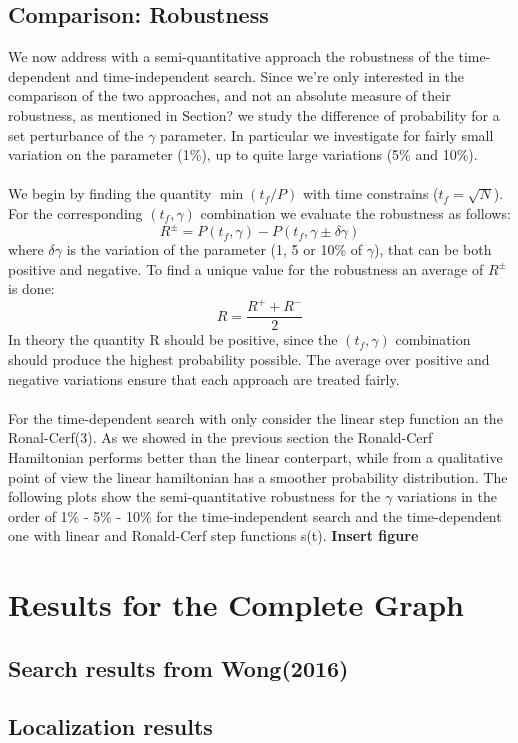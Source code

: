     \subsection{Comparison: Robustness}
    We now address with a semi-quantitative approach the robustness of the time-dependent and time-independent search. Since we're only interested in the comparison of the two approaches, and not an absolute measure of their robustness, as mentioned in Section? we study the difference of probability for a set perturbance of the $\gamma$ parameter. In particular we investigate for fairly small variation on the parameter (1\%), up to quite large variations (5\% and 10\%). \\ \\We begin by finding the quantity $\min(t_f/P)$ with time constrains ($t_f = \sqrt{N}$). For the corresponding $(t_f,\gamma)$ combination we evaluate the robustness as follows:
    \begin{equation}
        R ^\pm = P(t_f, \gamma) - P(t_f, \gamma \pm \delta\gamma)
    \end{equation}
    where $\delta\gamma$ is the variation of the parameter (1, 5 or 10\% of $\gamma$), that can be both positive and negative. To find a unique value for the robustness an average of $R^\pm$ is done:
    \begin{equation}
        R = \frac{R^++ R^-}{2}
    \end{equation}
    In theory the quantity R should be positive, since the $(t_f,\gamma)$ combination should produce the highest probability possible. The average over positive and negative variations ensure that each approach are treated fairly. \\ \\ For the time-dependent search with only consider the linear step function an the Ronal-Cerf(3). As we showed in the previous section the Ronald-Cerf Hamiltonian performs better than the linear conterpart, while from a qualitative point of view the linear hamiltonian has a smoother probability distribution. The following plots show the semi-quantitative robustness for the $\gamma$ variations in the order of 1\% - 5\% - 10\% for the time-independent search and the time-dependent one with linear and Ronald-Cerf step functions s(t).
    \textbf{Insert figure}



\section{Results for the Complete Graph}
    \subsection{Search results from Wong(2016)}
    \subsection{Localization results}
